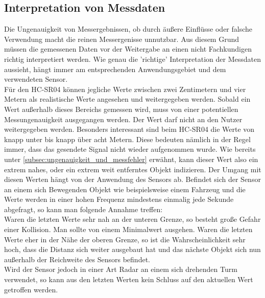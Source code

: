\subsection{Interpretation von Messdaten}
Die Ungenauigkeit von Messergebnissen, ob durch äußere Einflüsse oder falsche Verwendung macht die reinen Messergenisse unnutzbar. Aus diesem Grund müssen die gemessenen Daten vor der Weitergabe an einen nicht Fachkundigen richtig interpretiert werden. Wie genau die 'richtige' Interpretation der Messdaten aussieht, hängt immer am entsprechenden Anwendungsgebiet und dem verwendeten Sensor.\\
Für den HC-SR04 können jegliche Werte zwischen zwei Zentimetern und vier Metern als realistische Werte angesehen und weitergegeben werden. Sobald ein Wert außerhalb dieses Bereichs gemessen wird, muss von einer potentiellen Messungenauigkeit ausgegangen werden. Der Wert darf nicht an den Nutzer weitergegeben werden. Besonders interessant sind beim HC-SR04 die Werte von knapp unter bis knapp über acht Metern. Diese bedeuten nämlich in der Regel immer, dass das gesendete Signal nicht wieder aufgenommen wurde. Wie bereits unter \ref{subsec:ungenauigkeit_und_messfehler} erwähnt, kann dieser Wert also ein extrem nahes, oder ein extrem weit entferntes Objekt indizieren. Der Umgang mit diesen Werten hängt von der Anwendung des Sensors ab. Befindet sich der Sensor an einem sich Bewegenden Objekt wie beispielsweise einem Fahrzeug und die Werte werden in einer hohen Frequenz mindestens einmalig jede Sekunde abgefragt, so kann man folgende Annahme treffen:\\
Waren die letzten Werte sehr nah an der unteren Grenze, so besteht große Gefahr einer Kollision. Man sollte von einem Minimalwert ausgehen. Waren die letzten Werte eher in der Nähe der oberen Grenze, so ist die Wahrscheinlichkeit sehr hoch, dass die Distanz sich weiter ausgebaut hat und das nächste Objekt sich nun außerhalb der Reichweite des Sensors befindet.\\
Wird der Sensor jedoch in einer Art Radar an einem sich drehenden Turm verwendet, so kann aus den letzten Werten kein Schluss auf den aktuellen Wert getroffen werden.

